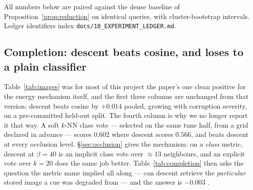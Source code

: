 \label{sec:results}

All numbers below are paired against the dense baseline of
Proposition~\ref{prop:reduction} on identical queries, with cluster-bootstrap intervals.
Ledger identifiers index \texttt{docs/10\_EXPERIMENT\_LEDGER.md}.

\subsection{Completion: descent beats cosine, and loses to a plain classifier}
\label{sec:completion}

\begin{table}[t]\centering\small
\caption{The image study with its matched baseline. The metric is \textbf{same-class top-1
accuracy} over ten classes, not identification, and the cue's source image is \emph{not} in
the bank --- see \S\ref{sec:occlusion}. $\beta$, $k$ and $\tau$ all selected on the same
disjoint tune half; one pre-committed paired test on the held-out half. $n{=}5{,}847$ query
instances from $1{,}949$ distinct images; bootstrap resamples images. $^{*}$CI excludes zero.}
\label{tab:images}

\end{table}

\begin{table}[t]\centering\small
\caption{Completion as the premise defines it (): cues are occluded copies of
images that \emph{are} in the bank, scored by \textbf{same-image} recall@1. Identity control
at $0\%$ occlusion: cosine recall@1 $=1.0000$. $\beta$ selected on a disjoint half of the
bank images and used once; selection chose $\beta{=}80$, the top of the grid. Same-class
accuracy on the identical cues is shown for comparison with Table~\ref{tab:images}.}
\label{tab:completion}

\end{table}

Table~\ref{tab:images} was for most of this project the paper's one clean positive for the
energy mechanism itself, and the first three columns are unchanged from that version:
descent beats cosine by $+0.014$ pooled, growing with corruption severity, on a
pre-committed held-out split. The fourth column is why we no longer report it that way. A
soft $k$-NN class vote --- selected on the same tune half, from a grid declared in advance
--- scores $0.602$ where descent scores $0.566$, and beats descent at every occlusion
level. \S\ref{sec:occlusion} gives the mechanism: on a \emph{class} metric, descent at
$\beta{=}40$ is an implicit class vote over $\approx 13$ neighbours, and an explicit vote
over $k{=}20$ does the same job better. Table~\ref{tab:completion} then asks the question
the metric name implied all along --- can descent retrieve the \emph{particular} stored
image a cue was degraded from --- and the answer is $-0.003$ .

